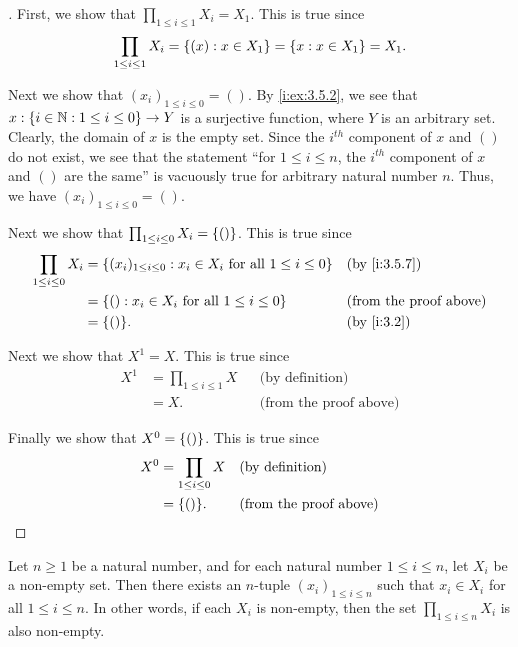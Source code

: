 \begin{proof}[]
  First, we show that \(\prod_{1 \leq i \leq 1} X_i = X_1\).
  This is true since
  \[
    \prod_{1 \leq i \leq 1} X_i = \left\lbrace(x) : x \in X_1\right\rbrace = \left\lbrace x : x \in X_1\right\rbrace = X_1.
  \]

  Next we show that \((x_i)_{1 \leq i \leq 0} = ()\).
  By \cref{i:ex:3.5.2}, we see that \(x : \left\lbrace i \in \mathbb{N} : 1 \leq i \leq 0\right\rbrace \to Y\) is a surjective function, where \(Y\) is an arbitrary set.
  Clearly, the domain of \(x\) is the empty set.
  Since the \(i^{th}\) component of \(x\) and \(()\) do not exist, we see that the statement ``for \(1 \leq i \leq n\), the \(i^{th}\) component of \(x\) and \(()\) are the same'' is vacuously true for arbitrary natural number \(n\).
  Thus, we have \((x_i)_{1 \leq i \leq 0} = ()\).

  Next we show that \(\prod_{1 \leq i \leq 0} X_i = \left\lbrace()\right\rbrace\).
  This is true since
  \begin{align*}
    \prod_{1 \leq i \leq 0} X_i & = \set{(x_i)_{1 \leq i \leq 0} : x_i \in X_i \text{ for all } 1 \leq i \leq 0} &  & \by{i:3.5.7}                  \\
                                & = \set{() : x_i \in X_i \text{ for all } 1 \leq i \leq 0}                      &  & \text{(from the proof above)} \\
                                & = \set{()}.                                                                    &  & \by{i:3.2}
  \end{align*}

  Next we show that \(X^1 = X\).
  This is true since
  \begin{align*}
    X^1 & = \prod_{1 \leq i \leq 1} X &  & \text{(by definition)}        \\
        & = X.                        &  & \text{(from the proof above)}
  \end{align*}

  Finally we show that \(X^0 = \left\lbrace()\right\rbrace\).
  This is true since
  \begin{align*}
    X^0 & = \prod_{1 \leq i \leq 0} X &  & \text{(by definition)}        \\
        & = \set{()}.                 &  & \text{(from the proof above)}
  \end{align*}
\end{proof}

\setcounter{thm}{11}
\begin{lem}\label{i:3.5.12}
  Let \(n \geq 1\) be a natural number, and for each natural number \(1 \leq i \leq n\), let \(X_i\) be a non-empty set.
  Then there exists an \(n\)-tuple \((x_i)_{1 \leq i \leq n}\) such that \(x_i \in X_i\) for all \(1 \leq i \leq n\).
  In other words, if each \(X_i\) is non-empty, then the set \(\prod_{1 \leq i \leq n} X_i\) is also non-empty.
\end{lem}

